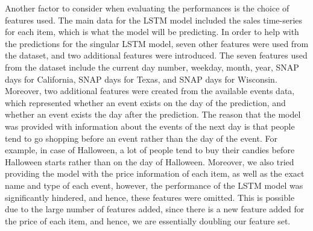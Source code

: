 Another factor to consider when evaluating the performances is the choice of features used.
The main data for the LSTM model included the sales time-series for each item, which is what the model will be predicting. 
In order to help with the predictions for the singular LSTM model, seven other features were used from the dataset, and two additional features were introduced. 
The seven features used from the dataset include the current day number, weekday, month, year, SNAP days for California, SNAP days for Texas, and SNAP days for Wisconsin. 
Moreover, two additional features were created from the available events data, which represented whether an event exists on the day of the prediction, and whether an event exists the day after the prediction.
The reason that the model was provided with information about the events of the next day is that people tend to go shopping before an event rather than the day of the event.
For example, in case of Halloween, a lot of people tend to buy their candies before Halloween starts rather than on the day of Halloween.
Moreover, we also tried providing the model with the price information of each item, as well as the exact name and type of each event, however, the performance of the LSTM model was significantly hindered, and hence, these features were omitted.
This is possible due to the large number of features added, since there is a new feature added for the price of each item, and hence, we are essentially doubling our feature set.

